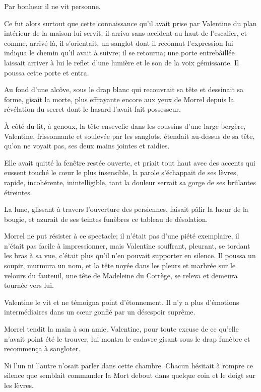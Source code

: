 Par bonheur il ne vit personne. 

Ce fut alors surtout que cette connaissance qu'il avait prise par Valentine du plan intérieur de la maison lui servit; il arriva sans accident au haut de l'escalier, et comme, arrivé là, il s'orientait, un sanglot dont il reconnut l'expression lui indiqua le chemin qu'il avait à suivre; il se retourna; une porte entrebâillée laissait arriver à lui le reflet d'une lumière et le son de la voix gémissante. Il poussa cette porte et entra. 

Au fond d'une alcôve, sous le drap blanc qui recouvrait sa tête et dessinait sa forme, gisait la morte, plus effrayante encore aux yeux de Morrel depuis la révélation du secret dont le hasard l'avait fait possesseur. 

À côté du lit, à genoux, la tête ensevelie dans les coussins d'une large bergère, Valentine, frissonnante et soulevée par les sanglots, étendait au-dessus de sa tête, qu'on ne voyait pas, ses deux mains jointes et raidies. 

Elle avait quitté la fenêtre restée ouverte, et priait tout haut avec des accents qui eussent touché le cœur le plus insensible, la parole s'échappait de ses lèvres, rapide, incohérente, inintelligible, tant la douleur serrait sa gorge de ses brûlantes étreintes. 

La lune, glissant à travers l'ouverture des persiennes, faisait pâlir la lueur de la bougie, et azurait de ses teintes funèbres ce tableau de désolation. 

Morrel ne put résister à ce spectacle; il n'était pas d'une piété exemplaire, il n'était pas facile à impressionner, mais Valentine souffrant, pleurant, se tordant les bras à sa vue, c'était plus qu'il n'en pouvait supporter en silence. Il poussa un soupir, murmura un nom, et la tête noyée dans les pleurs et marbrée sur le velours du fauteuil, une tête de Madeleine du Corrège, se releva et demeura tournée vers lui. 

Valentine le vit et ne témoigna point d'étonnement. Il n'y a plus d'émotions intermédiaires dans un cœur gonflé par un désespoir suprême. 

Morrel tendit la main à son amie. Valentine, pour toute excuse de ce qu'elle n'avait point été le trouver, lui montra le cadavre gisant sous le drap funèbre et recommença à sangloter. 

Ni l'un ni l'autre n'osait parler dans cette chambre. Chacun hésitait à rompre ce silence que semblait commander la Mort debout dans quelque coin et le doigt sur les lèvres. 


